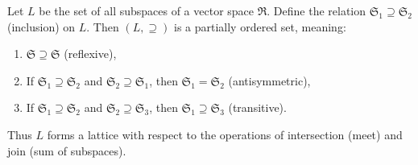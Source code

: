 Let $L$ be the set of all subspaces of a vector space $\mathfrak{R}$. Define the relation $\mathfrak{S}_1 \supseteq \mathfrak{S}_2$ (inclusion) on $L$. Then $(L, \supseteq)$ is a partially ordered set, meaning:

\begin{enumerate}
\item $\mathfrak{S} \supseteq \mathfrak{S}$ (reflexive),
\item If $\mathfrak{S}_1 \supseteq \mathfrak{S}_2$ and $\mathfrak{S}_2 \supseteq \mathfrak{S}_1$, then $\mathfrak{S}_1 = \mathfrak{S}_2$ (antisymmetric),
\item If $\mathfrak{S}_1 \supseteq \mathfrak{S}_2$ and $\mathfrak{S}_2 \supseteq \mathfrak{S}_3$, then $\mathfrak{S}_1 \supseteq \mathfrak{S}_3$ (transitive).
\end{enumerate}

Thus $L$ forms a lattice with respect to the operations of intersection (meet) and join (sum of subspaces).
